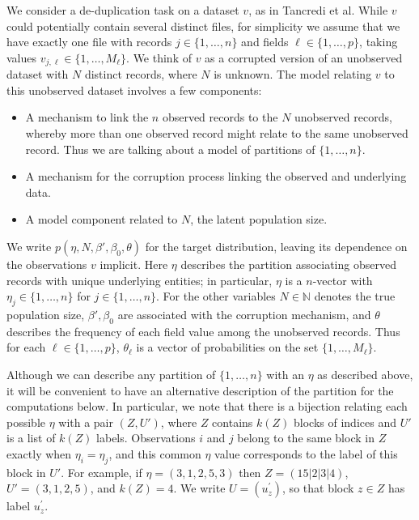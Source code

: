 \documentclass[ba]{imsart}
\begin{document}
We consider a de-duplication task on a dataset $v$, as in Tancredi et al. While $v$ could potentially contain several distinct files, for simplicity we assume that we have exactly one file with records $j \in \{1,\dots,n\}$ and fields $\ell \in \{1, \dots, p \}$, taking values ${v_{j,\ell} \in \{1, \dots, M_\ell\}}$.
We think of $v$ as a corrupted version of an unobserved dataset with $N$ distinct records, where $N$ is unknown.
The model relating $v$ to this unobserved dataset involves a few components:
\begin{itemize}
    \item A mechanism to link the $n$ observed records to the $N$ unobserved records, whereby more than one observed record might relate to the same unobserved record. Thus we are talking about a model of partitions of $\{1,\ldots,n\}$.
    \item A mechanism for the corruption process linking the observed and underlying data.
    \item A model component related to $N$, the latent population size.
\end{itemize}


We write $p(\eta, N, \beta', \beta_0, \theta)$ for the target distribution, leaving its dependence on the observations $v$ implicit. Here $\eta$ describes the partition associating observed records with unique underlying entities; in particular, $\eta$ is a $n$-vector with $\eta_j \in \{1,\ldots,n\}$ for $j \in \{1,\dots,n\}$.
For the other variables $N \in \mathbb{N}$ denotes the true population size, $\beta',\beta_0$ are associated with the corruption mechanism, and $\theta$ describes the frequency of each field value among the unobserved records. Thus for each $\ell \in \{1,\dots,p\}$, $\theta_\ell$ is a vector of probabilities on the set $\{1,\dots,M_\ell\}$.

Although we can describe any partition of $\{1, \dots, n\}$ with an $\eta$ as described above, it will be convenient to have an alternative description of the partition for the computations below. In particular, we note that there is a bijection relating each possible $\eta$ with a pair $(Z,U')$, where $Z$ contains $k(Z)$ blocks of indices and $U'$ is a list of $k(Z)$ labels.
Observations $i$ and $j$ belong to the same block in $Z$ exactly when $\eta_i = \eta_j$, and this common $\eta$ value corresponds to the label of this block in $U'$.
For example, if $\eta = (3,1,2,5,3)$ then $Z = (15|2|3|4)$, $U'=(3,1,2,5)$, and $k(Z) = 4$. We write $U = (u_z^\prime)$, so that block $z \in Z$ has label $u_z^\prime$.
\end{document}
